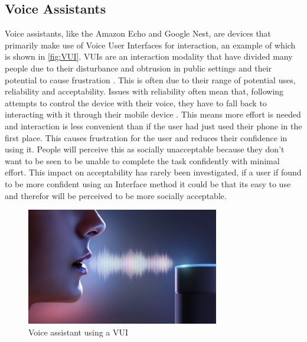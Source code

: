 \documentclass{l4proj}
\begin{document}
\subsection{Voice Assistants}


Voice assistants, like the Amazon Echo and Google Nest, are devices that primarily make use of Voice User Interfaces for interaction, an example of which is shown in \autoref{fig:VUI}. VUIs are an interaction modality that have divided many people due to their disturbance and obtrusion in public settings \citep{lee_interaction_2018} and their potential to cause frustration \citep{myers_patterns_2018}. This is often due to their range of potential uses, reliability and acceptability. Issues with reliability often mean that, following attempts to control the device with their voice, they have to fall back to interacting with it through their mobile device \citep{myers_patterns_2018}. This means more effort is needed and interaction is less convenient than if the user had just used their phone in the first place. This causes frustration for the user and reduces their confidence in using it. People will perceive this as socially unacceptable because they don't want to be seen to be unable to complete the task confidently with minimal effort. This impact on acceptability has rarely been investigated, if a user if found to be more confident using an Interface method it could be that its easy to use and therefor will be perceived to be more socially acceptable.

\begin{figure}[!htb]
    \centering
    \includegraphics[width=0.75\textwidth]{images/VUI.jpg}
        \caption{Voice assistant using a VUI}
        \label{fig:VUI}
\end{figure}
\end{document}
